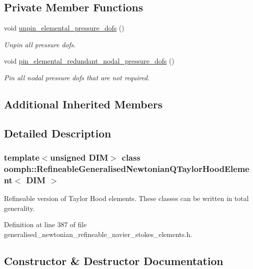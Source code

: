 \subsection*{Private Member Functions}
\begin{DoxyCompactItemize}
\item 
void \hyperlink{classoomph_1_1RefineableGeneralisedNewtonianQTaylorHoodElement_aab4ac8ef8f49d09cd1a32e292e0ca621}{unpin\+\_\+elemental\+\_\+pressure\+\_\+dofs} ()
\begin{DoxyCompactList}\small\item\em Unpin all pressure dofs. \end{DoxyCompactList}\item 
void \hyperlink{classoomph_1_1RefineableGeneralisedNewtonianQTaylorHoodElement_a809f295d07ea41ff6a71cf15ffb82692}{pin\+\_\+elemental\+\_\+redundant\+\_\+nodal\+\_\+pressure\+\_\+dofs} ()
\begin{DoxyCompactList}\small\item\em Pin all nodal pressure dofs that are not required. \end{DoxyCompactList}\end{DoxyCompactItemize}
\subsection*{Additional Inherited Members}


\subsection{Detailed Description}
\subsubsection*{template$<$unsigned D\+IM$>$\newline
class oomph\+::\+Refineable\+Generalised\+Newtonian\+Q\+Taylor\+Hood\+Element$<$ D\+I\+M $>$}

Refineable version of Taylor Hood elements. These classes can be written in total generality. 

Definition at line 387 of file generalised\+\_\+newtonian\+\_\+refineable\+\_\+navier\+\_\+stokes\+\_\+elements.\+h.



\subsection{Constructor \& Destructor Documentation}
\mbox{\label{classoomph_1_1RefineableGeneralisedNewtonianQTaylorHoodElement_a9f535663f1439f9da8be4dc0e888da07}} 
